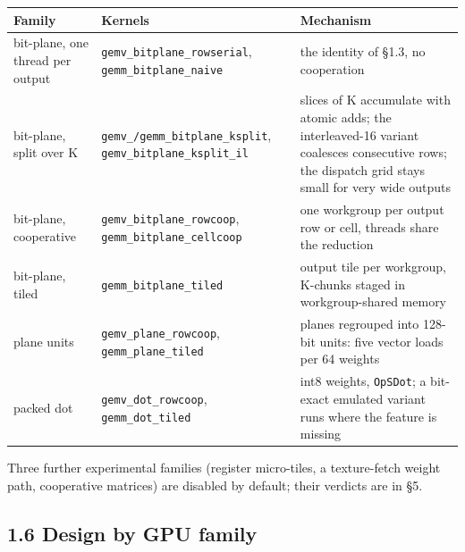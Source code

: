 \documentclass[
  10pt,
]{article}
\newcounter{none} %
\begin{document}
{\def\LTcaptype{none} %
\begin{longtable}[]{@{}
  >{\raggedright\arraybackslash}p{}
  >{\raggedright\arraybackslash}p{}
  >{\raggedright\arraybackslash}p{}@{}}
\toprule\noalign{}
\begin{minipage}[b]{\linewidth}\raggedright%
Family
\end{minipage} & \begin{minipage}[b]{\linewidth}\raggedright%
Kernels
\end{minipage} & \begin{minipage}[b]{\linewidth}\raggedright%
Mechanism
\end{minipage} \\
\midrule\noalign{}
\endhead%
\bottomrule\noalign{}
\endlastfoot%
bit-plane, one thread per output & \texttt{gemv\_bitplane\_rowserial},
\texttt{gemm\_bitplane\_naive} & the identity of \S{}1.3, no cooperation \\
bit-plane, split over K & \texttt{gemv\_/gemm\_bitplane\_ksplit},
\texttt{gemv\_bitplane\_ksplit\_il} & slices of K accumulate with atomic
adds; the interleaved-16 variant coalesces consecutive rows; the dispatch
grid stays small for very wide outputs \\
bit-plane, cooperative & \texttt{gemv\_bitplane\_rowcoop},
\texttt{gemm\_bitplane\_cellcoop} & one workgroup per output row or
cell, threads share the reduction \\
bit-plane, tiled & \texttt{gemm\_bitplane\_tiled} & output tile per
workgroup, K-chunks staged in workgroup-shared memory \\
plane units & \texttt{gemv\_plane\_rowcoop}, \texttt{gemm\_plane\_tiled}
& planes regrouped into 128-bit units: five vector loads per 64
weights \\
packed dot & \texttt{gemv\_dot\_rowcoop}, \texttt{gemm\_dot\_tiled} &
int8 weights, \texttt{OpSDot}; a bit-exact emulated variant runs where
the feature is missing \\
\end{longtable}
}

Three further experimental families (register micro-tiles, a
texture-fetch weight path, cooperative matrices) are disabled by
default; their verdicts are in \S{}5.

\subsection{1.6 Design by GPU family}\label{design-by-gpu-family}
\end{document}
